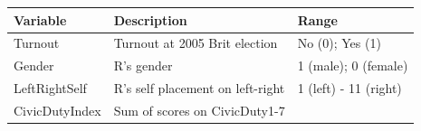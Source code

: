 \documentclass[]{article}
\theoremstyle{definition}
\theoremstyle{definition}
\theoremstyle{remark}
\begin{document}
\begin{longtable}[c]{@{}lll@{}}
\toprule
\begin{minipage}[b]{0.19\columnwidth}\raggedright\strut
Variable
\strut\end{minipage} &
\begin{minipage}[b]{0.49\columnwidth}\raggedright\strut
Description
\strut\end{minipage} &
\begin{minipage}[b]{0.27\columnwidth}\raggedright\strut
Range
\strut\end{minipage}\tabularnewline
\midrule
\endhead
\begin{minipage}[t]{0.19\columnwidth}\raggedright\strut
Turnout
\strut\end{minipage} &
\begin{minipage}[t]{0.49\columnwidth}\raggedright\strut
Turnout at 2005 Brit election
\strut\end{minipage} &
\begin{minipage}[t]{0.27\columnwidth}\raggedright\strut
No (0); Yes (1)
\strut\end{minipage}\tabularnewline
\begin{minipage}[t]{0.19\columnwidth}\raggedright\strut
Gender
\strut\end{minipage} &
\begin{minipage}[t]{0.49\columnwidth}\raggedright\strut
R's gender
\strut\end{minipage} &
\begin{minipage}[t]{0.27\columnwidth}\raggedright\strut
1 (male); 0 (female)
\strut\end{minipage}\tabularnewline
\begin{minipage}[t]{0.19\columnwidth}\raggedright\strut
LeftRightSelf
\strut\end{minipage} &
\begin{minipage}[t]{0.49\columnwidth}\raggedright\strut
R's self placement on left-right
\strut\end{minipage} &
\begin{minipage}[t]{0.27\columnwidth}\raggedright\strut
1 (left) - 11 (right)
\strut\end{minipage}\tabularnewline
\begin{minipage}[t]{0.19\columnwidth}\raggedright\strut
CivicDutyIndex
\strut\end{minipage} &
\begin{minipage}[t]{0.49\columnwidth}\raggedright\strut
Sum of scores on CivicDuty1-7
\strut\end{minipage} &

\end{longtable}
\end{document}

